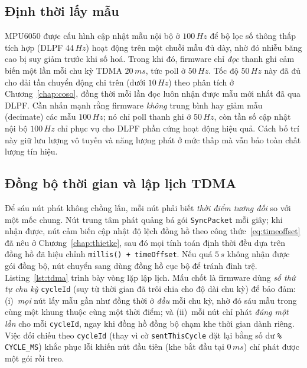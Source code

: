 \documentclass[../DoAn.tex]{subfiles}
\begin{document}
\subsection{Định thời lấy mẫu}
MPU6050 được cấu hình cập nhật mẫu nội bộ ở $100\,\si{Hz}$ để bộ lọc số thông thấp tích hợp (DLPF $44\,\si{Hz}$) hoạt động trên một chuỗi mẫu đủ dày, nhờ đó nhiễu băng cao bị suy giảm trước khi số hoá. Trong khi đó, firmware chỉ \emph{đọc} thanh ghi cảm biến một lần mỗi chu kỳ TDMA $20\,\si{ms}$, tức poll ở $50\,\si{Hz}$. Tốc độ $50\,\si{Hz}$ này đã đủ cho dải tần chuyển động chi trên (dưới $10\,\si{Hz}$) theo phân tích ở Chương~\ref{chap:coso}, đồng thời mỗi lần đọc luôn nhận được mẫu mới nhất đã qua DLPF. Cần nhấn mạnh rằng firmware \emph{không} trung bình hay giảm mẫu (decimate) các mẫu $100\,\si{Hz}$; nó chỉ poll thanh ghi ở $50\,\si{Hz}$, còn tần số cập nhật nội bộ $100\,\si{Hz}$ chỉ phục vụ cho DLPF phần cứng hoạt động hiệu quả. Cách bố trí này giữ lưu lượng vô tuyến và năng lượng phát ở mức thấp mà vẫn bảo toàn chất lượng tín hiệu.

\subsection{Đồng bộ thời gian và lập lịch TDMA}
Để sáu nút phát không chồng lấn, mỗi nút phải biết \emph{thời điểm tương đối} so với một mốc chung. Nút trung tâm phát quảng bá gói \texttt{SyncPacket} mỗi giây; khi nhận được, nút cảm biến cập nhật độ lệch đồng hồ theo công thức~\eqref{eq:timeoffset} đã nêu ở Chương~\ref{chap:thietke}, sau đó mọi tính toán định thời đều dựa trên đồng hồ đã hiệu chỉnh \texttt{millis()\,+\,timeOffset}. Nếu quá $5\,\si{s}$ không nhận được gói đồng bộ, nút chuyển sang dùng đồng hồ cục bộ để tránh đình trệ. Listing~\ref{lst:tdma} trình bày vòng lặp lập lịch. Mấu chốt là firmware dùng \emph{số thứ tự chu kỳ} \texttt{cycleId} (suy từ thời gian đã trôi chia cho độ dài chu kỳ) để bảo đảm: (i)~\emph{mọi} nút lấy mẫu gần như đồng thời ở \emph{đầu} mỗi chu kỳ, nhờ đó sáu mẫu trong cùng một khung thuộc cùng một thời điểm; và (ii)~mỗi nút chỉ phát \emph{đúng một lần} cho mỗi \texttt{cycleId}, ngay khi đồng hồ đồng bộ chạm khe thời gian dành riêng. Việc đối chiếu theo \texttt{cycleId} (thay vì cờ \texttt{sentThisCycle} đặt lại bằng số dư \texttt{\% CYCLE\_MS}) khắc phục lỗi khiến nút đầu tiên (khe bắt đầu tại $0\,\si{ms}$) chỉ phát được một gói rồi treo.
\end{document}
